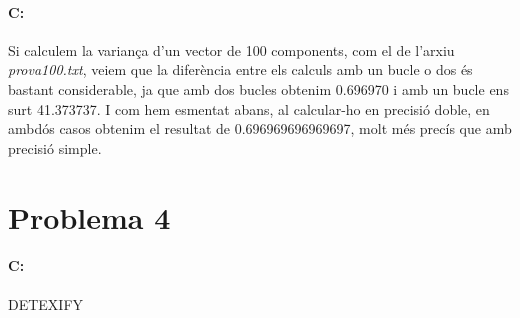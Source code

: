 \documentclass{article}
\begin{document}
	\paragraph{C:} Si calculem la variança d'un vector de 100 components, com el de l'arxiu \textit{prova100.txt}, veiem que la diferència entre els calculs amb un bucle o dos és bastant considerable, ja que amb dos bucles obtenim 0.696970 i amb un bucle ens surt 41.373737. I com hem esmentat abans, al calcular-ho en precisió doble, en ambdós casos obtenim el resultat de 0.696969696969697, molt més precís que amb precisió simple.
	
	\newpage
	
	\section{Problema 4}
	\paragraph{C:}
	
	
	
	DETEXIFY
	
\end{document}
